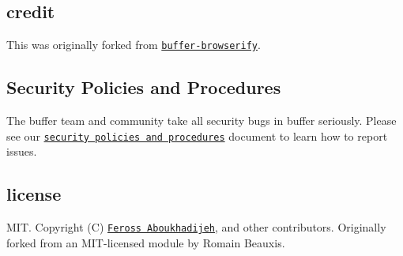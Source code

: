 \subsection*{credit}

This was originally forked from \href{https://github.com/toots/buffer-browserify}{\tt buffer-\/browserify}.

\subsection*{Security Policies and Procedures}

The {\ttfamily buffer} team and community take all security bugs in {\ttfamily buffer} seriously. Please see our \href{https://github.com/feross/security}{\tt security policies and procedures} document to learn how to report issues.

\subsection*{license}

M\+IT. Copyright (C) \href{http://feross.org}{\tt Feross Aboukhadijeh}, and other contributors. Originally forked from an M\+I\+T-\/licensed module by Romain Beauxis. 